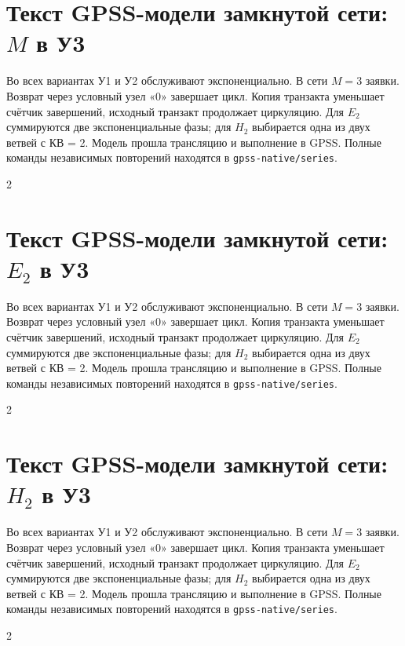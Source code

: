 \documentclass[12pt,a4paper]{article}
\begin{document}
\newpage\section{Текст GPSS-модели замкнутой сети: \(M\) в У3}
Во всех вариантах У1 и У2 обслуживают экспоненциально. 
В сети \(M=3\) заявки. Возврат через условный узел «0» завершает цикл. Копия транзакта уменьшает счётчик завершений, исходный транзакт продолжает циркуляцию. 
Для \(E_2\) суммируются две экспоненциальные фазы; для \(H_2\) выбирается одна из двух ветвей с КВ = 2. Модель прошла трансляцию и выполнение в GPSS. Полные команды независимых повторений находятся в \texttt{gpss-native/series}.\par
\begin{multicols}{2}\end{multicols}
\newpage\section{Текст GPSS-модели замкнутой сети: \(E_2\) в У3}
Во всех вариантах У1 и У2 обслуживают экспоненциально. 
В сети \(M=3\) заявки. Возврат через условный узел «0» завершает цикл. Копия транзакта уменьшает счётчик завершений, исходный транзакт продолжает циркуляцию. 
Для \(E_2\) суммируются две экспоненциальные фазы; для \(H_2\) выбирается одна из двух ветвей с КВ = 2. Модель прошла трансляцию и выполнение в GPSS. Полные команды независимых повторений находятся в \texttt{gpss-native/series}.\par
\begin{multicols}{2}\end{multicols}
\newpage\section{Текст GPSS-модели замкнутой сети: \(H_2\) в У3}
Во всех вариантах У1 и У2 обслуживают экспоненциально. 
В сети \(M=3\) заявки. Возврат через условный узел «0» завершает цикл. Копия транзакта уменьшает счётчик завершений, исходный транзакт продолжает циркуляцию. 
Для \(E_2\) суммируются две экспоненциальные фазы; для \(H_2\) выбирается одна из двух ветвей с КВ = 2. Модель прошла трансляцию и выполнение в GPSS. Полные команды независимых повторений находятся в \texttt{gpss-native/series}.\par
\begin{multicols}{2}\end{multicols}
\end{document}
